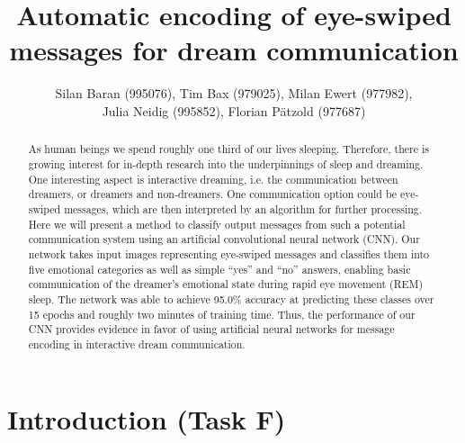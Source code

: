 \documentclass{article}
\title{Automatic encoding of eye-swiped messages for dream communication}
\author{Silan Baran (995076), Tim Bax (979025), Milan Ewert (977982), \\ 
        Julia Neidig (995852), Florian Pätzold (977687)}
\begin{document}
\maketitle

\begin{abstract}
\noindent
As human beings we spend roughly one third of our lives sleeping. Therefore, there is growing interest for in-depth research into the underpinnings of sleep and dreaming. One interesting aspect is interactive dreaming, i.e. the communication between dreamers, or dreamers and non-dreamers. One communication option could be eye-swiped messages, which are then interpreted by an algorithm for further processing. Here we will present a method to classify output messages from such a potential communication system using an artificial convolutional neural network (CNN). Our network takes input images representing eye-swiped messages and classifies them into five emotional categories as well as simple “yes” and “no” answers, enabling basic communication of the dreamer’s emotional state during rapid eye movement (REM) sleep. The network was able to achieve 95.0\% accuracy at predicting these classes over 15 epochs and roughly two minutes of training time. Thus, the performance of our CNN provides evidence in favor of using artificial neural networks for message encoding in interactive dream communication.
\end{abstract}



\section{Introduction (Task F)}
\end{document}
